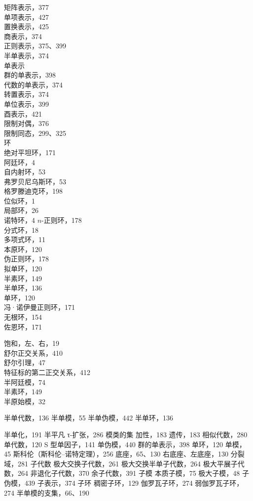 矩阵表示，377\\
单项表示，427\\
置换表示，425\\
商表示，374\\
正则表示，375、399\\
半单表示，374\\
单表示\\
群的单表示，398\\
代数的单表示，374\\
转置表示，374\\
单位表示，399\\
酉表示，421\\
限制对偶，376\\
限制同态，299、325\\
环\\
绝对平坦环，171\\
阿廷环，4\\
自内射环，53\\
弗罗贝尼乌斯环，53\\
格罗滕迪克环，198\\
位似环，1\\
局部环，26\\
诺特环，4 \(n\)-正则环，178\\
分式环，18\\
多项式环，11\\
本原环，120\\
伪正则环，178\\
拟单环，120\\
半素环，149\\
半单环，136\\
单环，120\\
冯·诺伊曼正则环，171\\
无根环，154\\
佐恩环，171


饱和，左、右，19\\
舒尔正交关系，410\\
舒尔引理，47\\
特征标的第二正交关系，412\\
半阿廷模，74\\
半素环，149\\
半原始模，32

半单代数，136 半单模，55 半单伪模，442 半单环，136

半单化，191 半平凡 τ-扩张，286 模类的集 加性，183 遗传，183 相似代数，280 单代数，120 S 型单因子，141 单伪模，440 群的单表示，398 单环，120 单模，45 斯科伦（斯科伦–诺特定理），256 底座，65、130 右底座、左底座，130 分裂域，281 子代数 极大交换子代数，261 极大交换半单子代数，264 极大平展子代数，264 非退化子代数，370 余子代数，391 子模 本质子模，75 极大子模，48 子伪模，439 子表示，374 子环 稠密子环，129 伽罗瓦子环，274 弱伽罗瓦子环，274 半单模的支集，66、190

